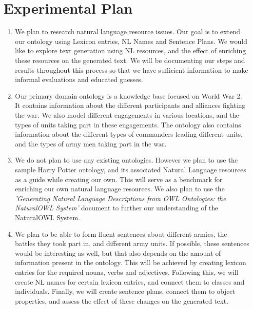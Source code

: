 \documentclass[12pt, letterpaper]{article}
\title{
\vspace{2in}
\textmd{\textbf{\hmwkTitle\\ \large\hmwkClass}}\\
\normalsize\vspace{0.1in}\large{\groupMemberOne}\\
\normalsize\vspace{0.1in}\large{\groupMemberTwo}\\
\normalsize\vspace{0.1in}\large{\groupMemberThree}\\
\normalsize\vspace{0.1in}\large{\groupMemberFour}\\
\vspace{3in}
}
\begin{document}
  \maketitle
  \newpage

  \section*{Experimental Plan}

  	\begin{enumerate}
  		\item
  		We plan to research natural language resource issues. 
      Our goal is to extend our ontology using Lexicon entries, NL Names and Sentence Plans.
  		We would like to explore text generation using NL resources, and the effect of enriching these resources 
      on the generated text.
  		We will be documenting our steps and results throughout this process so that we have sufficient information 
      to make informal evaluations and educated guesses.

  		\item
  		Our primary domain ontology is a knowledge base focused on World War 2.
      It contains information about the different participants and alliances fighting the war.
      We also model different engagements in various locations, and the types of units taking part in these engagements.
      The ontology also contains information about the different types of commanders leading different units, and
      the types of army men taking part in the war.

  		\item
      We do not plan to use any existing ontologies. However we plan to use the sample Harry Potter ontology, and its 
      associated Natural Language resources as a guide while creating our own. 
      This will serve as a benchmark for enriching our own natural language resources. 
      We also plan to use the \textit{'Generating Natural Language Descriptions from OWL Ontologies: the NaturalOWL System'} 
      document to further our understanding of the NaturalOWL System.

  		\item
      We plan to be able to form fluent sentences about different armies, the battles they took part in, and different
      army units.
      If possible, these sentences would be interesting as well, but that also depends on the amount of information
      present in the ontology.
      This will be achieved by creating lexicon entries for the required nouns, verbs and adjectives.
      Following this, we will create NL names for certain lexicon entries, and connect them to classes and individuals.
      Finally, we will create sentence plans, connect them to object properties, and assess the effect of these changes 
      on the generated text.


\end{enumerate}
\end{document}
